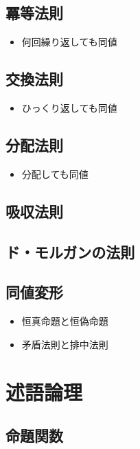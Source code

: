 \documentclass[../../imaging-math]{subfiles}
\begin{document}
\subsection{冪等法則}

\begin{mindflow}
  \begin{itemize}
    \item 何回繰り返しても同値
  \end{itemize}
\end{mindflow}

\subsection{交換法則}

\begin{mindflow}
  \begin{itemize}
    \item ひっくり返しても同値
  \end{itemize}
\end{mindflow}

\subsection{分配法則}

\begin{mindflow}
  \begin{itemize}
    \item 分配しても同値
  \end{itemize}
\end{mindflow}

\subsection{吸収法則}

\subsection{ド・モルガンの法則}

\subsection{同値変形}

\begin{mindflow}
  \begin{itemize}
    \item 恒真命題と恒偽命題
    \item 矛盾法則と排中法則
  \end{itemize}
\end{mindflow}

\section{述語論理}

\subsection{命題関数}
\end{document}
